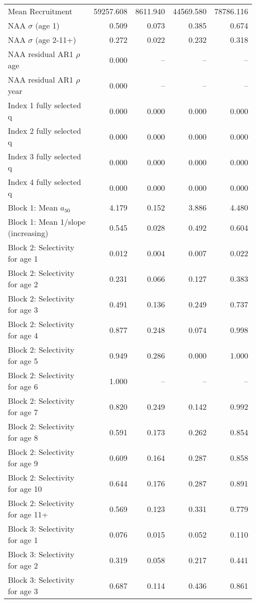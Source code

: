\documentclass[
]{article}
\begin{document}
\begin{landscape}
\begin{longtable}[t]{lrrrr}
\endfoot
\bottomrule
\endlastfoot
Mean Recruitment & 59257.608 & 8611.940 & 44569.580 & 78786.116\\
NAA $\sigma$ (age 1) & 0.509 & 0.073 & 0.385 & 0.674\\
NAA $\sigma$ (age 2-11+) & 0.272 & 0.022 & 0.232 & 0.318\\
NAA residual AR1 $\rho$ age & 0.000 & -- & -- & --\\
NAA residual AR1 $\rho$ year & 0.000 & -- & -- & --\\
\addlinespace
Index 1 fully selected q & 0.000 & 0.000 & 0.000 & 0.000\\
Index 2 fully selected q & 0.000 & 0.000 & 0.000 & 0.000\\
Index 3 fully selected q & 0.000 & 0.000 & 0.000 & 0.000\\
Index 4 fully selected q & 0.000 & 0.000 & 0.000 & 0.000\\
Block 1: Mean $a_{50}$ & 4.179 & 0.152 & 3.886 & 4.480\\
\addlinespace
Block 1: Mean 1/slope (increasing) & 0.545 & 0.028 & 0.492 & 0.604\\
Block 2: Selectivity for age 1 & 0.012 & 0.004 & 0.007 & 0.022\\
Block 2: Selectivity for age 2 & 0.231 & 0.066 & 0.127 & 0.383\\
Block 2: Selectivity for age 3 & 0.491 & 0.136 & 0.249 & 0.737\\
Block 2: Selectivity for age 4 & 0.877 & 0.248 & 0.074 & 0.998\\
\addlinespace
Block 2: Selectivity for age 5 & 0.949 & 0.286 & 0.000 & 1.000\\
Block 2: Selectivity for age 6 & 1.000 & -- & -- & --\\
Block 2: Selectivity for age 7 & 0.820 & 0.249 & 0.142 & 0.992\\
Block 2: Selectivity for age 8 & 0.591 & 0.173 & 0.262 & 0.854\\
Block 2: Selectivity for age 9 & 0.609 & 0.164 & 0.287 & 0.858\\
\addlinespace
Block 2: Selectivity for age 10 & 0.644 & 0.176 & 0.287 & 0.891\\
Block 2: Selectivity for age 11+ & 0.569 & 0.123 & 0.331 & 0.779\\
Block 3: Selectivity for age 1 & 0.076 & 0.015 & 0.052 & 0.110\\
Block 3: Selectivity for age 2 & 0.319 & 0.058 & 0.217 & 0.441\\
Block 3: Selectivity for age 3 & 0.687 & 0.114 & 0.436 & 0.861\\

\end{longtable}
\end{landscape}
\end{document}
